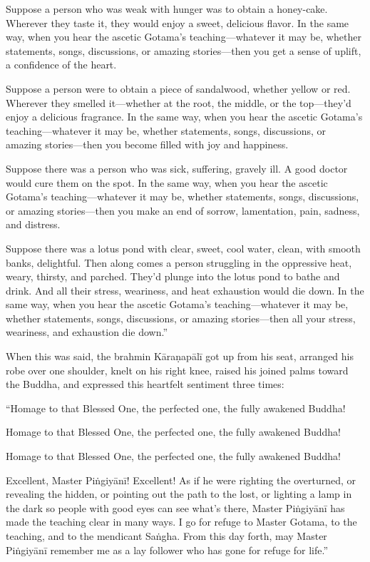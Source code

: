 \documentclass[12pt,openany]{book}%
\begin{document}
Suppose a person who was weak with hunger was to obtain a honey-cake. Wherever they taste it, they would enjoy a sweet, delicious flavor. In the same way, when you hear the ascetic Gotama’s teaching—whatever it may be, whether statements, songs, discussions, or amazing stories—then you get a sense of uplift, a confidence of the heart. 

Suppose a person were to obtain a piece of sandalwood, whether yellow or red. Wherever they smelled it—whether at the root, the middle, or the top—they’d enjoy a delicious fragrance. In the same way, when you hear the ascetic Gotama’s teaching—whatever it may be, whether statements, songs, discussions, or amazing stories—then you become filled with joy and happiness. 

Suppose there was a person who was sick, suffering, gravely ill. A good doctor would cure them on the spot. In the same way, when you hear the ascetic Gotama’s teaching—whatever it may be, whether statements, songs, discussions, or amazing stories—then you make an end of sorrow, lamentation, pain, sadness, and distress. 

Suppose there was a lotus pond with clear, sweet, cool water, clean, with smooth banks, delightful. Then along comes a person struggling in the oppressive heat, weary, thirsty, and parched. They’d plunge into the lotus pond to bathe and drink. And all their stress, weariness, and heat exhaustion would die down. In the same way, when you hear the ascetic Gotama’s teaching—whatever it may be, whether statements, songs, discussions, or amazing stories—then all your stress, weariness, and exhaustion die down.” 

When this was said, the brahmin \textsanskrit{Kāraṇapālī} got up from his seat, arranged his robe over one shoulder, knelt on his right knee, raised his joined palms toward the Buddha, and expressed this heartfelt sentiment three times: 

“Homage to that Blessed One, the perfected one, the fully awakened Buddha! 

Homage to that Blessed One, the perfected one, the fully awakened Buddha! 

Homage to that Blessed One, the perfected one, the fully awakened Buddha! 

Excellent, Master \textsanskrit{Piṅgiyānī}! Excellent! As if he were righting the overturned, or revealing the hidden, or pointing out the path to the lost, or lighting a lamp in the dark so people with good eyes can see what’s there, Master \textsanskrit{Piṅgiyānī} has made the teaching clear in many ways. I go for refuge to Master Gotama, to the teaching, and to the mendicant \textsanskrit{Saṅgha}. From this day forth, may Master \textsanskrit{Piṅgiyānī} remember me as a lay follower who has gone for refuge for life.” 
\end{document}

